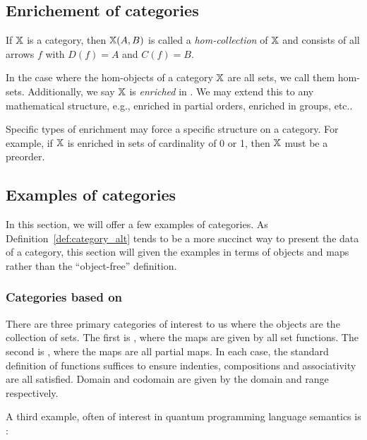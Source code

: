\subsection{Enrichement of categories} %
\label{sub:enrichement_of_categories}
\begin{definition}\label{def:hom-collection}
  If $\mathbb{X}$ is a category, then $\mathbb{X}(A,B)$ is called a \emph{hom-collection} of $\mathbb{X}$ and consists
  of all arrows $f$ with $D(f) = A$ and $C(f) = B$.
\end{definition}

In the case where the hom-objects of a category $\mathbb{X}$ are all sets, we call them hom-sets. Additionally,
we say $\mathbb{X}$ is \emph{enriched} in \sets. We may extend this to any mathematical structure, e.g.,
enriched in partial orders, enriched in groups, etc..


Specific types of enrichment may force a specific structure on a category. For example, if $\mathbb{X}$ is
enriched in sets of cardinality of 0 or 1, then $\mathbb{X}$ must be a preorder.


\subsection{Examples of categories} %
\label{sub:examples_of_categories}
In this section, we will offer a few examples of categories. As Definition~\ref{def:category_alt}
tends to be a more succinct way to present the data of a category, this section will given the
examples in terms of objects and maps rather than the ``object-free'' definition.


\subsubsection{Categories based on \protect{\sets}} %
\label{ssub:categories_based_on_sets}
There are three primary categories of interest to us where the objects are the collection of sets.
The first is \sets, where the maps are given by all set functions. The second is \Par, where the
maps are all partial maps. In each case, the standard definition of functions suffices to ensure
indenties, compositions and associativity are all satisfied. Domain and codomain are given by the
domain and range respectively.

A third example, often of interest in quantum programming language semantics is \rel:

